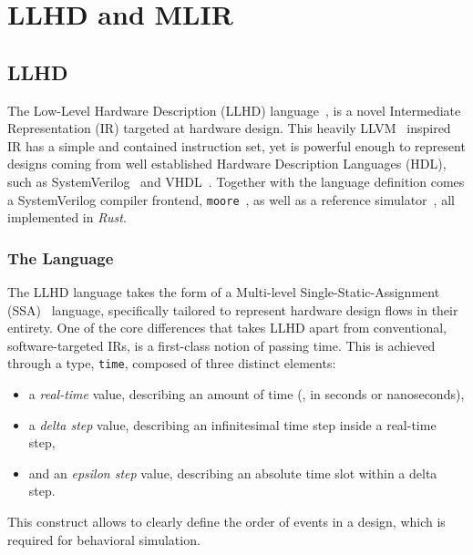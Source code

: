 \chapter{LLHD and MLIR}
\label{ch:ir}


\section{LLHD}
\label{section:llhd}
The Low-Level Hardware Description (LLHD) language~\cite{Schuiki2020, llhd.io}, is a novel Intermediate Representation (IR) targeted at hardware design. This heavily LLVM~\cite{lattner.llvm} inspired IR has a simple and contained instruction set, yet is powerful enough to represent designs coming from well established Hardware Description Languages (HDL), such as SystemVerilog~\cite{SV2018} and VHDL~\cite{VHDL2009}. Together with the language definition comes a SystemVerilog compiler frontend, \texttt{moore}~\cite{moore}, as well as a reference simulator~\cite{llhd-sim}, all implemented in \textit{Rust}.


\subsection{The Language}
The LLHD language takes the form of a Multi-level Single-Static-Assignment (SSA)~\cite{Alpern1988} language, specifically tailored to represent hardware design flows in their entirety.
One of the core differences that takes LLHD apart from conventional, software-targeted IRs, is a first-class notion of passing time. This is achieved through a type, \texttt{time}, composed of three distinct elements:

\begin{itemize}
    \item a \textit{real-time} value, describing an amount of time (\eg, in seconds or nanoseconds),
    \item a \textit{delta step} value, describing an infinitesimal time step inside a real-time step,
    \item and an \textit{epsilon step} value, describing an absolute time slot within a delta step.
\end{itemize}

This construct allows to clearly define the order of events in a design, which is required for behavioral simulation.

